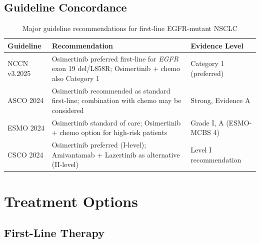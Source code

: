 \documentclass[10pt,letterpaper]{article}
\begin{document}
\subsection{Guideline Concordance}

\begin{table}[H]
\centering
\small
\begin{tabular}{p{3cm}p{8cm}p{3.5cm}}
\toprule
\textbf{Guideline} & \textbf{Recommendation} & \textbf{Evidence Level} \\
\midrule
NCCN v3.2025 & Osimertinib preferred first-line for \textit{EGFR} exon 19 del/L858R; Osimertinib + chemo also Category 1 & Category 1 (preferred) \\
ASCO 2024 & Osimertinib recommended as standard first-line; combination with chemo may be considered & Strong, Evidence A \\
ESMO 2024 & Osimertinib standard of care; Osimertinib + chemo option for high-risk patients & Grade I, A (ESMO-MCBS 4) \\
CSCO 2024 & Osimertinib preferred (I-level); Amivantamab + Lazertinib as alternative (II-level) & Level I recommendation \\
\bottomrule
\end{tabular}
\caption{Major guideline recommendations for first-line EGFR-mutant NSCLC}
\end{table}

\section{Treatment Options}

\subsection{First-Line Therapy}

\vspace{3pt}
\end{document}
